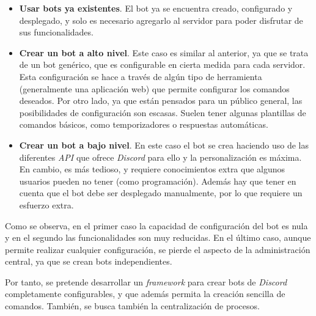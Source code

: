\begin{itemize}
	\item \textbf{Usar bots ya existentes}. El bot ya se encuentra creado, configurado y desplegado, y solo es necesario agregarlo al servidor para poder disfrutar de sus funcionalidades.
	\item \textbf{Crear un bot a alto nivel}. Este caso es similar al anterior, ya que se trata de un bot genérico, que es configurable en cierta medida para cada servidor. Esta configuración se hace a través de algún tipo de herramienta (generalmente una aplicación web) que permite configurar los comandos deseados. Por otro lado, ya que están pensados para un público general, las posibilidades de configuración son escasas. Suelen tener algunas plantillas de comandos básicos, como temporizadores o respuestas automáticas.
	\item \textbf{Crear un bot a bajo nivel}. En este caso el bot se crea haciendo uso de las diferentes \textit{API} que ofrece \textit{Discord} para ello y la personalización es máxima. En cambio, es más tedioso, y requiere conocimientos extra que algunos usuarios pueden no tener (como programación). Además hay que tener en cuenta que el bot debe ser desplegado manualmente, por lo que requiere un esfuerzo extra.
\end{itemize}

Como se observa, en el primer caso la capacidad de configuración del bot es nula y en el segundo las funcionalidades son muy reducidas. En el último caso, aunque permite realizar cualquier configuración, se pierde el aspecto de la administración central, ya que se crean bots independientes. 

Por tanto, se pretende desarrollar un \textit{framework} para crear bots de \textit{Discord} completamente configurables, y que además permita la creación sencilla de comandos. También, se busca también la centralización de procesos.

